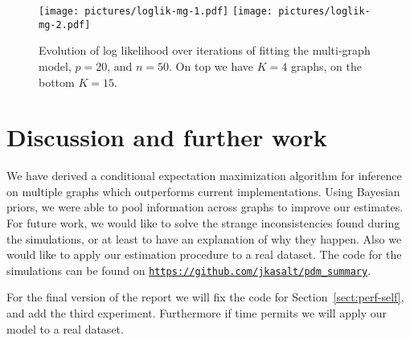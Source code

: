 \documentclass[a4paper, 11pt, oneside]{report}
\newcommand{\1}{\mathds{1}}
\begin{document}
\begin{figure}[ht]
  \begin{center}
    \texttt{[image: pictures/loglik-mg-1.pdf]}
    \texttt{[image: pictures/loglik-mg-2.pdf]}
    \hfill
  \end{center}
  \caption{Evolution of log likelihood over iterations of fitting the multi-graph model, $p=20$, and $n=50$. On top we have $K=4$ graphs, on the bottom $K=15$.}
  \label{fig:loglik-mg-1}
\end{figure}


\chapter{Discussion and further work}
We have derived a conditional expectation maximization algorithm for inference on multiple graphs
which outperforms current implementations. Using Bayesian priors, we were able to pool information across
graphs to improve our estimates. 
For future work, we would like to solve the strange inconsistencies found during the simulations, or at 
least to have an explanation of why they happen.
Also we would like to apply our estimation procedure to a real dataset.
The code for the simulations can be found on
\href{https://github.com/jkasalt/pdm_summary}{\texttt{https://github.com/jkasalt/pdm\_summary}}.

For the final version of the report we will fix the code for Section~\ref{sect:perf-self}, and add the third experiment. Furthermore if time permits we will apply our model to a real dataset. 

\cleardoublepage
{}
{}
\printbibliography
\end{document}
